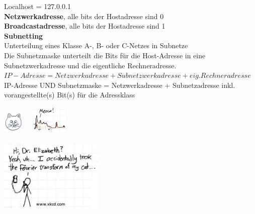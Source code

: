 \documentclass[fs, footer]{latex4ei}
\begin{document}
\begin{multicols*}{4}
{	Localhost = 127.0.0.1 \\
	\textbf{Netzwerkadresse}, alle bits der Hostadresse sind 0 \\
	\textbf{Broadcastadresse}, alle bits der Hostadresse sind 1  \\
	

	\textbf{Subnetting} \\
	Unterteilung eines Klasse A-, B- oder C-Netzes in Subnetze \\
	Die Subnetzmaske unterteilt die Bits für die Host-Adresse in eine Subnetzwerkadresse und die eigentliche Rechneradresse. \\
	$IP-Adresse = Netzwerkadresse + Subnetzwerkadresse + eig. Rechneradresse$ \\
	IP-Adresse UND Subnetzmaske = Netzwerkadresse + Subnetzadresse inkl. vorangestellte(s) Bit(s) für die Adressklass \\
	

}

\sectionbox{
	\subsection{}

}


\sectionbox{
	\subsection{}

}





\columnbreak



 \qquad \includegraphics[height = 1cm]{./img/cat.jpg} \ \raisebox{0.5cm}{$\FT$}\ \includegraphics[height = 1.3cm]{./img/cat_f.jpg}\\
\\
\includegraphics[width = 5cm]{./img/xkcd2.jpg}



\end{multicols*}
\end{document}
